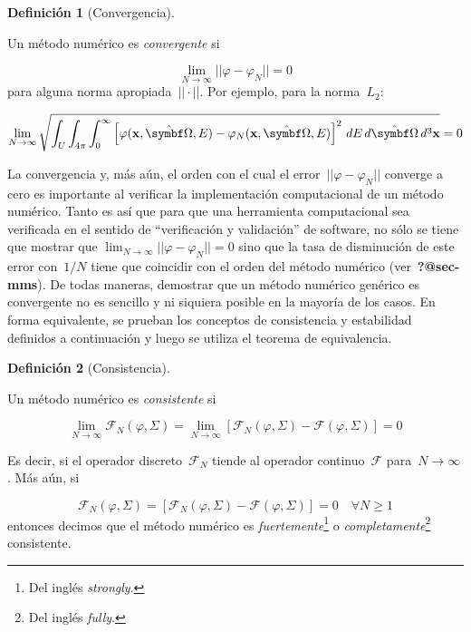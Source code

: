 \documentclass[
  12pt,
  a4paper,
  table]{scrbook}
\theoremstyle{plain}
\theoremstyle{definition}
\newtheorem{definition}{Definición}[chapter]
\theoremstyle{plain}
\theoremstyle{plain}
\theoremstyle{remark}
\begin{document}
\begin{definition}[Convergencia]\protect\hypertarget{def-convergencia}{}\label{def-convergencia}

Un método numérico es \emph{convergente} si

\[
\lim_{N\rightarrow \infty} || \varphi - \varphi_N || = 0
\] para alguna norma apropiada~\(||\cdot||\). Por ejemplo, para la
norma~\(L_2\):

\[
\lim_{N\rightarrow \infty} \sqrt{\int_U \int_{4\pi} \int_{0}^{\infty} 
\left[ \varphi(\vec{x},\omegaversor,E) - \varphi_N(\vec{x},\omegaversor,E) \right]^2
\, dE \, d\omegaversor \, d^3\vec{x} }  = 0
\]

\end{definition}

La convergencia y, más aún, el orden con el cual el
error~\(|| \varphi - \varphi_N ||\) converge a cero es importante al
verificar la implementación computacional de un método numérico. Tanto
es así que para que una herramienta computacional sea verificada en el
sentido de ``verificación y validación'' de software, no sólo se tiene
que mostrar que
\(\lim_{N\rightarrow \infty} || \varphi - \varphi_N || = 0\) sino que la
tasa de disminución de este error con~\(1/N\) tiene que coincidir con el
orden del método numérico (ver~\textbf{?@sec-mms}). De todas maneras,
demostrar que un método numérico genérico es convergente no es sencillo
y ni siquiera posible en la mayoría de los casos. En forma equivalente,
se prueban los conceptos de consistencia y estabilidad definidos a
continuación y luego se utiliza el teorema de equivalencia.

\begin{definition}[Consistencia]\protect\hypertarget{def-consistencia}{}\label{def-consistencia}

Un método numérico es \emph{consistente} si

\[
\lim_{N\rightarrow \infty} \mathcal{F}_N(\varphi, \Sigma) =
\lim_{N\rightarrow \infty} \left[ \mathcal{F}_N(\varphi, \Sigma) - \mathcal{F}(\varphi, \Sigma) \right] = 0
\]

Es decir, si el operador discreto~\(\mathcal{F}_N\) tiende al operador
continuo~\(\mathcal{F}\) para~\(N\rightarrow \infty\). Más aún, si

\[
\mathcal{F}_N(\varphi, \Sigma) =
\left[ \mathcal{F}_N(\varphi, \Sigma) - \mathcal{F}(\varphi, \Sigma) \right] = 0 \quad \forall N \geq 1
\] entonces decimos que el método numérico es
\emph{fuertemente}\footnote{Del inglés
  \foreignlanguage{american}{\emph{strongly}}.} o
\emph{completamente}\footnote{Del inglés
  \foreignlanguage{american}{\emph{fully}}.} consistente.

\end{definition}
\end{document}
